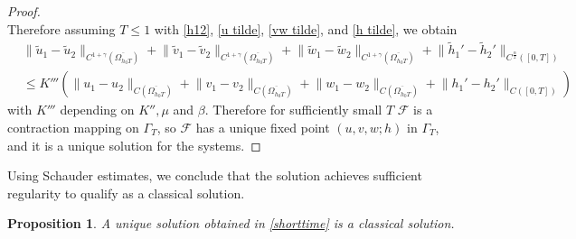 \documentclass[11pt]{amsart}
\numberwithin{equation}{section}
\theoremstyle{plain}
\newtheorem{proposition}[theorem]{Proposition}
\theoremstyle{definition}
\begin{document}
\begin{proof}
\begin{equation}
		\end{equation}
		Therefore assuming $T \leq 1$ with \cref{h12}, \cref{u tilde}, \cref{vw tilde}, and \cref{h tilde}, we obtain
		\begin{equation*}
		\begin{aligned}
			&\lVert \widetilde u_1 - \widetilde u_2 \rVert_{C^{1+\gamma}(\overline{\Omega_{h_0 T}})}
			+\lVert \widetilde v_1 - \widetilde v_2 \rVert_{C^{1+\gamma}(\overline{\Omega_{h_0 T}})}
			+\lVert \widetilde w_1 - \widetilde w_2 \rVert_{C^{1+\gamma}(\overline{\Omega_{h_0 T}})}
			+\lVert \widetilde h_1'-\widetilde h_2' \rVert_{C^{\frac{\alpha}{2}}([0,T])}\\
			&\leq K''' (\lVert u_1-u_2 \rVert_{C(\overline{\Omega_{h_0 T}})}
			+\lVert v_1-v_2 \rVert_{C(\overline{\Omega_{h_0 T}})}
			+\lVert w_1-w_2 \rVert_{C(\overline{\Omega_{h_0 T}})}
			+\lVert h_1'-h_2' \rVert_{C([0,T])})
		\end{aligned}
		\end{equation*}
		with $K'''$ depending on $K'', \mu$ and $\beta$. Therefore for sufficiently small $T$ $\mathcal{F}$ is a contraction mapping on $\Gamma_T$, so $\mathcal{F}$ has a unique fixed point $(u,v,w;h)$ in $\Gamma_T$, and it is a unique solution for the systems.
\end{proof}

Using Schauder estimates, we conclude that the solution achieves sufficient regularity to qualify as a classical solution.

\begin{proposition}
	A unique solution obtained in \cref{shorttime} is a classical solution.
\end{proposition}
\end{document}
